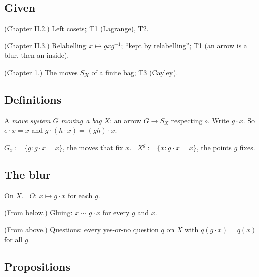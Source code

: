 \subsection*{Given}

\begin{lines}
\item[\lab{G1}] (Chapter II.2.) Left cosets; T1 (Lagrange), T2.
\item[\lab{G2}] (Chapter II.3.) Relabelling $x \mapsto g x g^{-1}$; ``kept by relabelling''; T1 (an arrow is a blur, then an inside).
\item[\lab{G3}] (Chapter 1.) The moves $S_X$ of a finite bag; T3 (Cayley).
\end{lines}

\subsection*{Definitions}

\begin{lines}
\item[\lab{D1}] A \emph{move system $G$ moving a bag $X$}: an arrow $G \to S_X$ respecting $\circ$. Write $g \cdot x$. So $e \cdot x = x$ and $g \cdot (h \cdot x) = (gh) \cdot x$.
\item[\lab{D2}] $G_x := \{ g : g \cdot x = x \}$, the moves that fix $x$. \ $X^g := \{ x : g \cdot x = x \}$, the points $g$ fixes.
\end{lines}

\subsection*{The blur}

On $X$. \ $O$: $x \mapsto g \cdot x$ for each $g$.

\begin{lines}
\item[\lab{B1}] (From below.) Gluing: $x \sim g \cdot x$ for every $g$ and $x$.
\item[\lab{B2}] (From above.) Questions: every yes-or-no question $q$ on $X$ with $q(g \cdot x) = q(x)$ for all $g$.
\end{lines}

\subsection*{Propositions}

